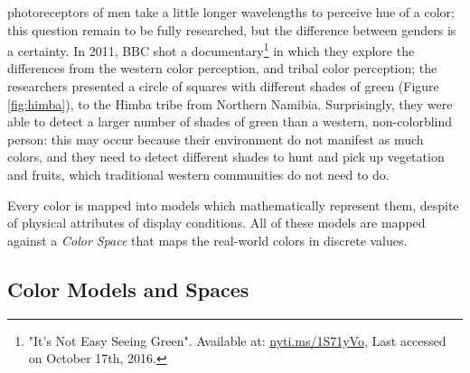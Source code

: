 photoreceptors of men take a little longer wavelengths to perceive hue of a color; this question remain
to be fully researched, but the difference between genders is a certainty. In 2011, BBC shot a
documentary\footnote{\label{itsnoteasy}"It's Not Easy Seeing Green". Available at:
{\url {nyti.ms/1S71yVo}},
Last accessed on October 17th, 2016.} in which they explore the differences from the western color
perception, and tribal color perception; the researchers presented a circle of squares with different
shades of green (Figure \ref{fig:himba}), to the Himba tribe from Northern Namibia. Surprisingly, they were able to detect a larger
number of shades of green than a western, non-colorblind person: this may occur because their environment do not
manifest as much colors, and they need to detect different shades to hunt and pick up vegetation and
fruits, which traditional western communities do not need to do. \\
\par
Every color is mapped into models which mathematically represent them, despite of physical attributes of display conditions.
All of these models are mapped against a \emph{Color Space} that maps the real-world colors in discrete values.
%
%
\subsection{Color Models and Spaces}
\label{subsec:colormodelspaces}
%
